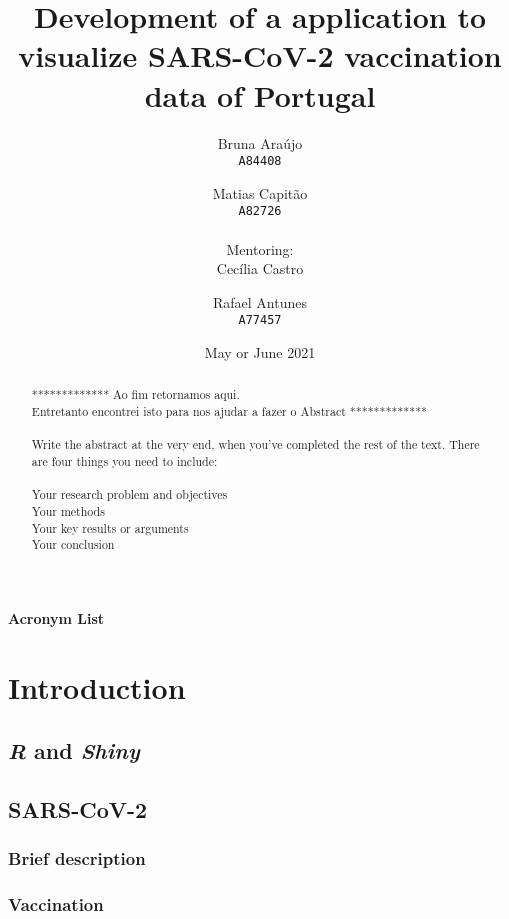 \documentclass[11pt,a4paper]{report}
\title{Development of a \Shiny application to visualize SARS-CoV-2 vaccination data of Portugal}
\author{
  Bruna Araújo\\
  \texttt{A84408}
  \and
  Matias Capitão\\
  \texttt{A82726} \\ 
  \\ Mentoring:\\
  Cecília Castro\\
  \and
  Rafael Antunes\\
  \texttt{A77457}
}
\date{May or June 2021}
\def\R{{\textsl{R }}}
\def\Shiny{\textsl{Shiny }}
\begin{document}
\maketitle

\begin{abstract}
    ************* Ao fim retornamos aqui.\\ Entretanto encontrei isto para nos ajudar a fazer o Abstract *************\\ \\
    Write the abstract at the very end, when you’ve completed the rest of the text. There are four things you need to include:\\ \\

    Your research problem and objectives\\
    Your methods\\
    Your key results or arguments\\
    Your conclusion

\end{abstract}

\tableofcontents
\newpage

\listoffigures
\newpage

\listoftables
\newpage

{\huge\textbf{Acronym List}}\\



\chapter{Introduction}
\section{\R and \Shiny}




\section{SARS-CoV-2}
\subsection{Brief description}



\subsection{Vaccination}

\end{document}
